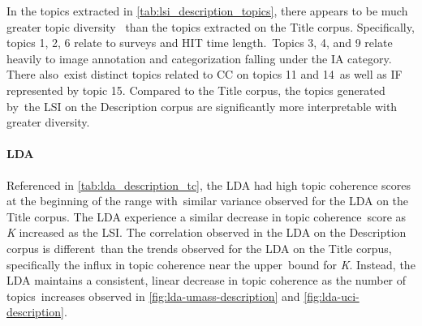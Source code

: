 \documentclass[letterpaper,12pt]{article}
\begin{document}
In the topics extracted in \ref{tab:lsi_description_topics}, there appears to be much greater topic diversity \
than the topics extracted on the Title corpus. Specifically, topics 1, 2, 6 relate to surveys and HIT time length.\
Topics 3, 4, and 9 relate heavily to image annotation and categorization falling under the IA category. There also\
 exist distinct topics related to CC on topics 11 and 14\
as well as IF represented by topic 15. Compared to the Title corpus, the topics generated by\
the LSI on the Description corpus are significantly more interpretable with greater diversity.
\newpage

\paragraph{LDA}
Referenced in \ref{tab:lda_description_tc}, the LDA had high topic coherence scores at the beginning of the range with\
similar variance observed for the LDA on the Title corpus. The LDA experience a similar decrease in topic coherence\
score as \emph{K} increased as the LSI. The correlation observed in the LDA on the Description corpus is different\
than the trends observed for the LDA on the Title corpus, specifically the influx in topic coherence near the upper\
bound for \emph{K}. Instead, the LDA maintains a consistent, linear decrease in topic coherence as the number of topics\
increases observed in \ref{fig:lda-umass-description} and \ref{fig:lda-uci-description}.
\end{document}
